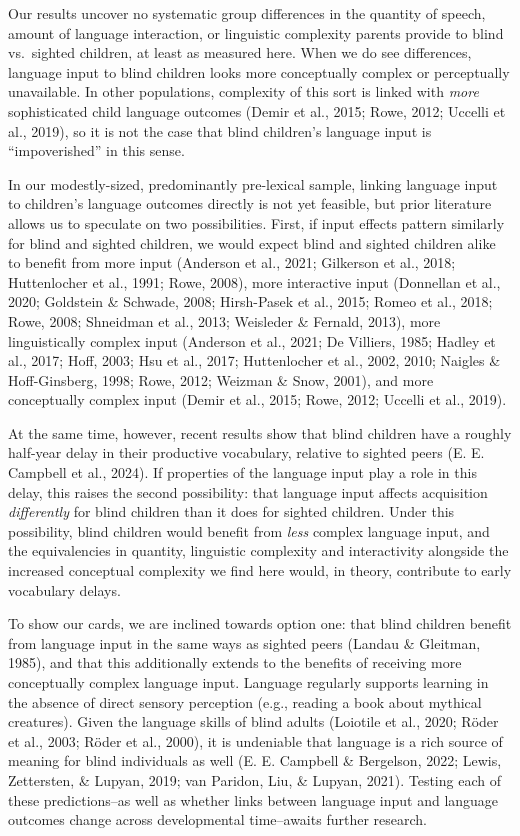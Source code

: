 \documentclass[
  man,floatsintext]{apa6}
\begin{document}
Our results uncover no systematic group differences in the quantity of speech, amount of language interaction, or linguistic complexity parents provide to blind vs.~sighted children, at least as measured here. When we do see differences, language input to blind children looks more conceptually complex or perceptually unavailable. In other populations, complexity of this sort is linked with \emph{more} sophisticated child language outcomes (Demir et al., 2015; Rowe, 2012; Uccelli et al., 2019), so it is not the case that blind children's language input is ``impoverished'' in this sense.

In our modestly-sized, predominantly pre-lexical sample, linking language input to children's language outcomes directly is not yet feasible, but prior literature allows us to speculate on two possibilities. First, if input effects pattern similarly for blind and sighted children, we would expect blind and sighted children alike to benefit from more input (Anderson et al., 2021; Gilkerson et al., 2018; Huttenlocher et al., 1991; Rowe, 2008), more interactive input (Donnellan et al., 2020; Goldstein \& Schwade, 2008; Hirsh-Pasek et al., 2015; Romeo et al., 2018; Rowe, 2008; Shneidman et al., 2013; Weisleder \& Fernald, 2013), more linguistically complex input (Anderson et al., 2021; De Villiers, 1985; Hadley et al., 2017; Hoff, 2003; Hsu et al., 2017; Huttenlocher et al., 2002, 2010; Naigles \& Hoff-Ginsberg, 1998; Rowe, 2012; Weizman \& Snow, 2001), and more conceptually complex input (Demir et al., 2015; Rowe, 2012; Uccelli et al., 2019).

At the same time, however, recent results show that blind children have a roughly half-year delay in their productive vocabulary, relative to sighted peers (E. E. Campbell et al., 2024). If properties of the language input play a role in this delay, this raises the second possibility: that language input affects acquisition \emph{differently} for blind children than it does for sighted children. Under this possibility, blind children would benefit from \emph{less} complex language input, and the equivalencies in quantity, linguistic complexity and interactivity alongside the increased conceptual complexity we find here would, in theory, contribute to early vocabulary delays.

To show our cards, we are inclined towards option one: that blind children benefit from language input in the same ways as sighted peers (Landau \& Gleitman, 1985), and that this additionally extends to the benefits of receiving more conceptually complex language input. Language regularly supports learning in the absence of direct sensory perception (e.g., reading a book about mythical creatures). Given the language skills of blind adults (Loiotile et al., 2020; Röder et al., 2003; Röder et al., 2000), it is undeniable that language is a rich source of meaning for blind individuals as well (E. E. Campbell \& Bergelson, 2022; Lewis, Zettersten, \& Lupyan, 2019; van Paridon, Liu, \& Lupyan, 2021). Testing each of these predictions--as well as whether links between language input and language outcomes change across developmental time--awaits further research.
\end{document}
